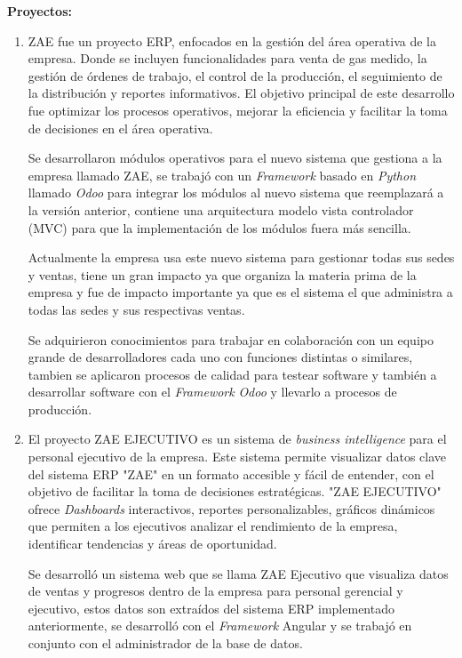 \documentclass[protocolo.tex]{subfiles}
\begin{document}
\textbf{Proyectos:}
\begin{enumerate}
\item ZAE fue un proyecto ERP,  enfocados  en  la  gestión  del  área  operativa  de  la  empresa.  Donde se  incluyen  funcionalidades  para  venta de gas medido, la gestión de órdenes de trabajo, el control de la producción, el seguimiento de la distribución y reportes informativos.  El  objetivo  principal  de  este  desarrollo  fue  optimizar  los  procesos  operativos,  mejorar  la  eficiencia  y  facilitar  la  toma  de  decisiones  en  el  área  operativa.


Se desarrollaron módulos operativos para el nuevo sistema que gestiona a la empresa llamado ZAE, se
trabajó con un \textit{Framework} basado en \textit{Python} llamado \textit{Odoo} para integrar los módulos al
nuevo sistema que reemplazará a la versión anterior, contiene una arquitectura modelo vista controlador (MVC) para
que la implementación de los módulos fuera más sencilla.


Actualmente la empresa usa este nuevo sistema para gestionar todas sus sedes y ventas,
tiene un gran impacto ya que organiza la materia prima de la empresa y fue de impacto
importante ya que es el sistema el que administra a todas las sedes y sus respectivas
ventas.

Se adquirieron conocimientos para trabajar en colaboración con un equipo grande de desarrolladores cada uno
con funciones distintas o similares, tambien se aplicaron procesos de calidad para testear software y
también a desarrollar software con el \textit{Framework} \textit{Odoo} y llevarlo a procesos de producción.


\item El proyecto ZAE EJECUTIVO es un sistema  de  \textit{business intelligence}  para  el  personal  ejecutivo  de  la  empresa.  Este  sistema  permite  visualizar  datos  clave  del  sistema  ERP  "ZAE"  en  un  formato  accesible  y  fácil  de  entender,  con  el  objetivo  de  facilitar  la  toma  de  decisiones  estratégicas.  "ZAE  EJECUTIVO"  ofrece \textit{Dashboards} interactivos, reportes personalizables, gráficos dinámicos que  permiten  a  los  ejecutivos  analizar  el  rendimiento  de  la  empresa,  identificar  tendencias  y  áreas  de  oportunidad.


Se desarrolló un sistema web que se llama ZAE Ejecutivo que visualiza datos de ventas y progresos dentro de la
empresa para personal gerencial y ejecutivo, estos datos son extraídos del sistema ERP
implementado anteriormente, se desarrolló con el \textit{Framework} Angular y se trabajó en
conjunto con el administrador de la base de datos.



\end{enumerate}
\end{document}
